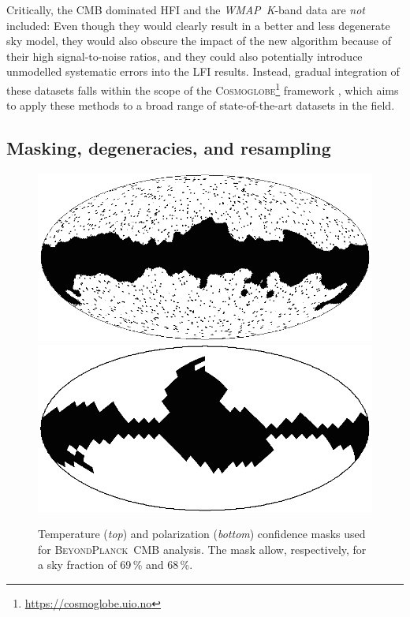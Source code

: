 \documentclass[twocolumn]{aa}
\def\cosmoglobe{\textsc{Cosmoglobe}}
\def\WMAP{\textit{WMAP}}
\newcommand{\BP}{\textsc{BeyondPlanck}}
\begin{document}
Critically, the CMB dominated HFI and the \WMAP\ \textit K-band data are
\emph{not} included: Even though they would clearly result in a better
and less degenerate sky model, they would also obscure the impact of
the new algorithm because of their high signal-to-noise ratios, and
they could also potentially introduce unmodelled systematic errors
into the LFI results. Instead, gradual integration of these datasets
falls within the scope of the
\cosmoglobe\footnote{\url{https://cosmoglobe.uio.no}} framework
\citep{bp05,bp17}, which aims to apply these methods to a broad range
of state-of-the-art datasets in the field.

\subsection{Masking, degeneracies, and resampling}
\label{sec:resampling}

\begin{figure}[t]
  \center
  \includegraphics[width=\linewidth]{figs/BP10_Tmask.png}\\
  \includegraphics[width=\linewidth]{figs/BP10_Pmask.png}
  \caption{Temperature (\emph{top}) and polarization (\emph{bottom}) confidence
    masks used for \BP\ CMB analysis. The mask allow, respectively, for 
    a sky fraction of 69\,\% and 68\,\%.}
  \label{fig:confmasks}
\end{figure}
\end{document}
